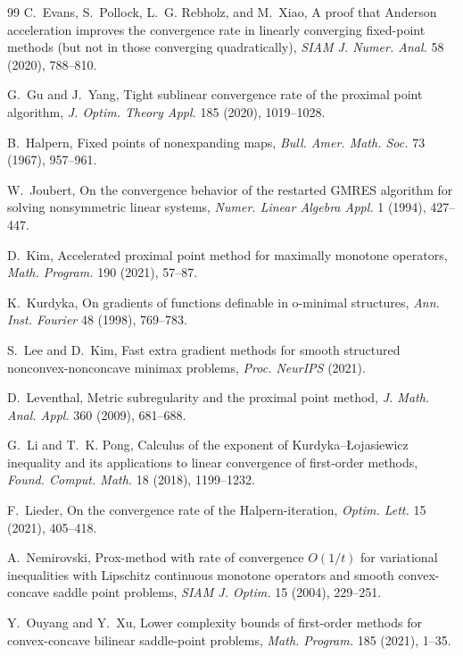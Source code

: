 \documentclass[11pt]{article}
\theoremstyle{definition}
\theoremstyle{remark}
\begin{document}
\begin{thebibliography}{99}
C.~Evans, S.~Pollock, L.~G. Rebholz, and M.~Xiao, A proof that Anderson
acceleration improves the convergence rate in linearly converging
fixed-point methods (but not in those converging quadratically),
\emph{SIAM J. Numer. Anal.} 58 (2020), 788--810.

G.~Gu and J.~Yang, Tight sublinear convergence rate of the proximal point
algorithm, \emph{J. Optim. Theory Appl.} 185 (2020), 1019--1028.

B.~Halpern, Fixed points of nonexpanding maps, \emph{Bull. Amer. Math.
Soc.} 73 (1967), 957--961.

W.~Joubert, On the convergence behavior of the restarted GMRES algorithm
for solving nonsymmetric linear systems, \emph{Numer. Linear Algebra
Appl.} 1 (1994), 427--447.

D.~Kim, Accelerated proximal point method for maximally monotone
operators, \emph{Math. Program.} 190 (2021), 57--87.

K.~Kurdyka, On gradients of functions definable in o-minimal structures,
\emph{Ann. Inst. Fourier} 48 (1998), 769--783.

S.~Lee and D.~Kim, Fast extra gradient methods for smooth structured
nonconvex-nonconcave minimax problems, \emph{Proc. NeurIPS} (2021).

D.~Leventhal, Metric subregularity and the proximal point method,
\emph{J. Math. Anal. Appl.} 360 (2009), 681--688.

G.~Li and T.~K. Pong, Calculus of the exponent of Kurdyka--{\L}ojasiewicz
inequality and its applications to linear convergence of first-order
methods, \emph{Found. Comput. Math.} 18 (2018), 1199--1232.

F.~Lieder, On the convergence rate of the Halpern-iteration,
\emph{Optim. Lett.} 15 (2021), 405--418.

A.~Nemirovski, Prox-method with rate of convergence $O(1/t)$ for
variational inequalities with Lipschitz continuous monotone operators and
smooth convex-concave saddle point problems, \emph{SIAM J. Optim.} 15
(2004), 229--251.

Y.~Ouyang and Y.~Xu, Lower complexity bounds of first-order methods for
convex-concave bilinear saddle-point problems, \emph{Math. Program.} 185
(2021), 1--35.


\end{thebibliography}
\end{document}

